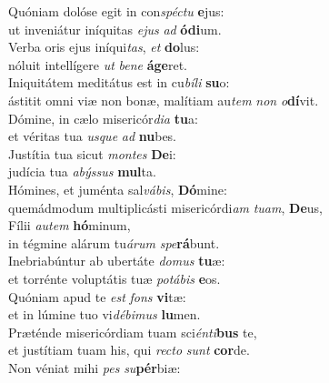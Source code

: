 \evenverse Quóniam dolóse egit in con\textit{spé}\textit{ctu} \textbf{e}jus:~\*\\
\evenverse ut inveniátur iníquitas \textit{e}\textit{jus} \textit{ad} \textbf{ó}\textbf{di}um.\\
\oddverse Verba oris ejus iníqui\textit{tas}, \textit{et} \textbf{do}lus:~\*\\
\oddverse nóluit intellígere \textit{ut} \textit{be}\textit{ne} \textbf{á}\textbf{ge}ret.\\
\evenverse Iniquitátem meditátus est in cu\textit{bí}\textit{li} \textbf{su}o:~\*\\
\evenverse ástitit omni viæ non bonæ, malítiam au\textit{tem} \textit{non} \textit{o}\textbf{dí}vit.\\
\oddverse Dómine, in cælo misericór\textit{di}\textit{a} \textbf{tu}a:~\*\\
\oddverse et véritas tua \textit{us}\textit{que} \textit{ad} \textbf{nu}bes.\\
\evenverse Justítia tua sicut \textit{mon}\textit{tes} \textbf{De}i:~\*\\
\evenverse judícia tua \textit{a}\textit{býs}\textit{sus} \textbf{mul}ta.\\
\oddverse Hómines, et juménta sal\textit{vá}\textit{bis}, \textbf{Dó}mine:~\*\\
\oddverse quemádmodum multiplicásti misericórdi\textit{am} \textit{tu}\textit{am}, \textbf{De}us,\\
\evenverse Fílii \textit{au}\textit{tem} \textbf{hó}minum,~\*\\
\evenverse in tégmine alárum tu\textit{á}\textit{rum} \textit{spe}\textbf{rá}bunt.\\
\oddverse Inebriabúntur ab ubertáte \textit{do}\textit{mus} \textbf{tu}æ:~\*\\
\oddverse et torrénte voluptátis tuæ \textit{po}\textit{tá}\textit{bis} \textbf{e}os.\\
\evenverse Quóniam apud te \textit{est} \textit{fons} \textbf{vi}tæ:~\*\\
\evenverse et in lúmine tuo vi\textit{dé}\textit{bi}\textit{mus} \textbf{lu}men.\\
\oddverse Præténde misericórdiam tuam sci\textit{én}\textit{ti}\textbf{bus} te,~\*\\
\oddverse et justítiam tuam his, qui \textit{re}\textit{cto} \textit{sunt} \textbf{cor}de.\\
\evenverse Non véniat mihi \textit{pes} \textit{su}\textbf{pér}biæ:~\*\\
